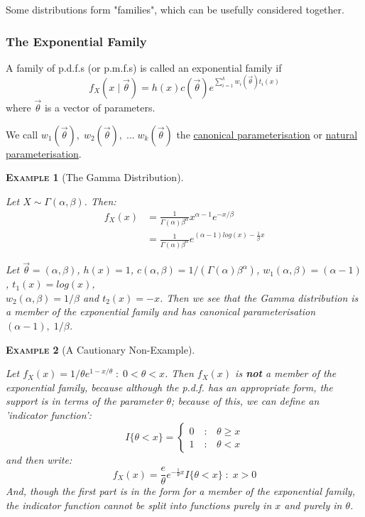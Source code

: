 \documentclass[12pt,a4paper]{article}
\newtheorem{example}{\textsc{Example}}[section]
\begin{document}
Some distributions form "families", which can be usefully considered together.

\subsubsection{The Exponential Family}

A family of p.d.f.s (or p.m.f.s) is called an exponential family if
$$f_X(x\; | \; \vec{\theta}) = h(x) c(\vec{\theta}) e^{\sum\limits_{i=1}^k w_i(\vec{\theta}) t_i(x)}$$
where $\vec{\theta}$ is a vector of parameters.

We call $w_1(\vec{\theta}),\; w_2(\vec{\theta}),\; ...\; w_k(\vec{\theta})$ the \underline{canonical parameterisation} or \underline{natural parameterisation}.

\begin{example}[The Gamma Distribution]$\;$\par
\vspace{1cm}

Let $X \sim \Gamma(\alpha, \beta)$. Then:
\begin{align*}
f_X(x) &= \frac{1}{\Gamma(\alpha) \beta^\alpha} x^{\alpha-1}e^{-x/\beta}\\
&= \frac{1}{\Gamma(\alpha)\beta^\alpha}e^{(\alpha-1)log(x) - \frac{1}{\beta}x}
\end{align*}

Let $\vec{\theta} = (\alpha,\beta)$, $h(x) = 1$, $c(\alpha,\beta) = 1/(\Gamma(\alpha)\beta^\alpha)$, $w_1(\alpha,\beta) = (\alpha-1)$, $t_1(x) = log(x)$,\\ $w_2(\alpha, \beta) = 1/\beta$ and $t_2(x) = -x$. Then we see that the Gamma distribution is a member of the exponential family and has canonical parameterisation $(\alpha-1),\; 1/\beta$.

\end{example}

\begin{example}[A Cautionary Non-Example]$\;$\par
\vspace{1cm}

Let $f_X(x) = 1/\theta e^{1-x/\theta}\; : \; 0<\theta<x$. Then $f_X(x)$ is \textbf{not} a member of the exponential family, because although the p.d.f. has an appropriate form, the support is in terms of the parameter $\theta$; because of this, we can define an 'indicator function':
$$I\{\theta<x\} = \left\{\begin{array}{cl} 0 \quad :& \theta \geq x\\ 1\quad :& \theta<x \end{array}\right.$$
and then write:
$$f_X(x) = \frac{e}{\theta}e^{-\frac{1}{\theta}x}I\{\theta < x\}\; : \; x>0$$
And, though the first part is in the form for a member of the exponential family, the indicator function cannot be split into functions purely in $x$ and purely in $\theta$.

\end{example}
\end{document}
